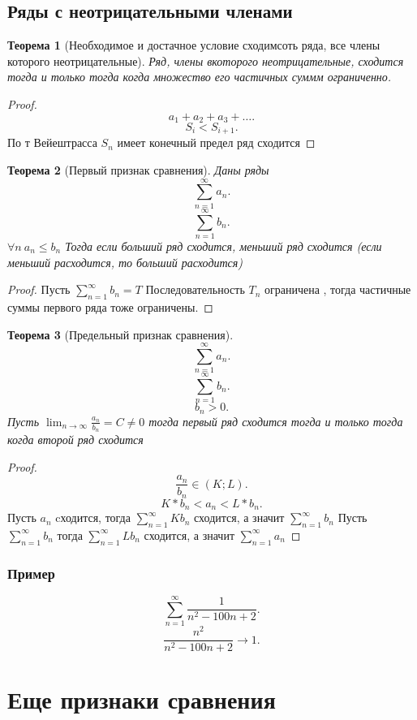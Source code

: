 \documentclass{scrartcl}
\newtheorem{theorem}{Теорема}
\begin{document}
\subsection{Ряды с неотрицательными членами}
\begin{theorem}[Необходимое и достачное условие сходимсоть ряда, все члены которого неотрицательные]
    Ряд, члены вкоторого неотрицательные, сходится тогда и только тогда когда множество его частичных суммм ограниченно.
\end{theorem}
\begin{proof}
    \[
    a_1+a_2 +a_3 +\dots
    .\] 
    \[
        S_i < S_{i + 1}
    .\] 
    По т Вейештрасса $S_{n}$ имеет конечный предел ряд сходится
\end{proof}
\begin{theorem}[Первый признак сравнения]
    Даны ряды
    \[
    \sum_{n=1}^{\infty} a_{n}
    .\] 
    \[
        \sum_{n=1}^{\infty} b_{n}
    .\] 
    $\forall n ~ a_{n} \le  b_{n}$ 
    Тогда если больший ряд сходится, меньший ряд сходится (если меньший расходится, то больший расходится)
\end{theorem}
\begin{proof}
    Пусть  $\sum_{n=1}^{\infty} b_{n} = T$ 
    Последовательность $T_{n}$ ограничена , тогда частичные суммы первого ряда тоже ограничены.
\end{proof}
\begin{theorem}[Предельный признак сравнения]
    \[
    \sum_{n=1}^{\infty} a_{n}
    .\] 
    \[
    \sum_{n=1}^{\infty} b_{n}
    .\] 
    \[
    b_{n} > 0
    .\] 
    Пусть $\lim_{n \to \infty} \frac{a_{n}}{b_{n}} = C \neq 0$ тогда первый ряд сходится тогда и только тогда когда второй ряд сходится
\end{theorem}
\begin{proof}
    \[
    \frac{a_{n}}{b_{n}} \in (K;L)
    .\] 
    \[
    K * b_{n} < a_{n} < L * b_{n}
    .\] 
    Пусть $a_{n}$ cходится, тогда $\sum_{n=1}^{\infty}K b_{n}$ сходится,  а значит $\sum_{n=1}^{\infty} b_{n}$ 
    Пусть $\sum_{n=1}^{\infty} b_{n}$ тогда $\sum_{n=1}^{\infty} L b_{n}$ сходится, а значит $\sum_{n=1}^{\infty} a_{n}$
\end{proof}
\subsubsection{Пример}
\[
\sum_{n=1}^{\infty} \frac{1}{n^2 - 100n + 2}
.\] 
\[
\frac{n^2}{n^2  -100n + 2} \to 1
.\] 
\section{Еще признаки сравнения}
\end{document}
